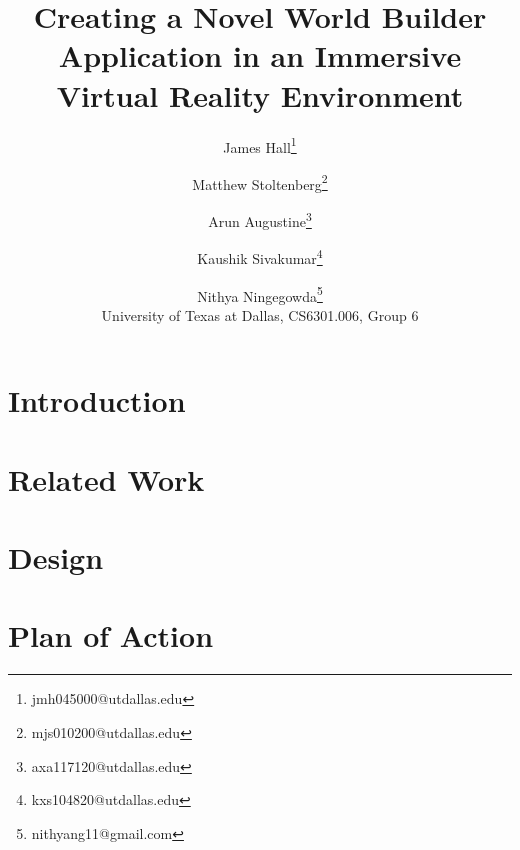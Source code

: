 \documentclass{vgtc}
\title{Creating a Novel World Builder Application in an Immersive Virtual Reality Environment}
\author{James Hall\thanks{jmh045000@utdallas.edu}
\and Matthew Stoltenberg\thanks{mjs010200@utdallas.edu}
\and Arun Augustine\thanks{axa117120@utdallas.edu}
\and Kaushik Sivakumar\thanks{kxs104820@utdallas.edu}
\and Nithya Ningegowda\thanks{nithyang11@gmail.com}
\\ \scriptsize University of Texas at Dallas, CS6301.006, Group 6}
\begin{document}
\maketitle

\section{Introduction}


\section{Related Work}


\section{Design}


\section{Plan of Action}




\end{document}
